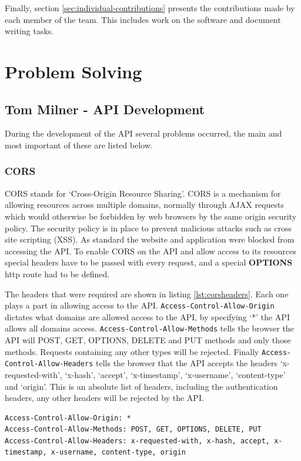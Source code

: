 \documentclass[11pt,a4paper]{report}
\begin{document}
Finally, section \ref{sec:individual-contributions} presents the contributions made by each member of the team. This includes work on the software and document writing tasks.

\newpage

\section{Problem Solving}
\label{sec:problem-solving}

\subsection{Tom Milner - API Development}
During the development of the API several problems occurred, the main and most important of these are listed below.

\subsubsection{CORS}
CORS stands for `Cross-Origin Resource Sharing'. CORS is a mechanism for allowing resources across multiple domains, normally through AJAX requests which would otherwise be forbidden by web browsers by the same origin security policy. The security policy is in place to prevent malicious attacks such as cross site scripting (XSS). As standard the website and application were blocked from accessing the API. To enable CORS on the API and allow access to its resources special headers have to be passed with every request, and a special \textbf{OPTIONS} http route had to be defined. 

The headers that were required are shown in listing \ref{lst:corsheaders}. Each one plays a part in allowing access to the API. \lstinline$Access-Control-Allow-Origin$ dictates what domains are allowed access to the API, by specifying `*' the API allows all domains access. \lstinline$Access-Control-Allow-Methods$ tells the browser the API will POST, GET, OPTIONS, DELETE and PUT methods and only those methods. Requests containing any other types will be rejected. Finally \lstinline$Access-Control-Allow-Headers$ tells the browser that the API accepts the headers `x-requested-with', `x-hash', `accept', `x-timestamp', `x-username', `content-type' and `origin'. This is an absolute list of headers, including the authentication headers, any other headers will be rejected by the API. 

\begin{lstlisting}[captionpos=b, caption=The CORS headers, label=lst:corsheaders]
Access-Control-Allow-Origin: *
Access-Control-Allow-Methods: POST, GET, OPTIONS, DELETE, PUT
Access-Control-Allow-Headers: x-requested-with, x-hash, accept, x-timestamp, x-username, content-type, origin
\end{lstlisting}
\end{document}
